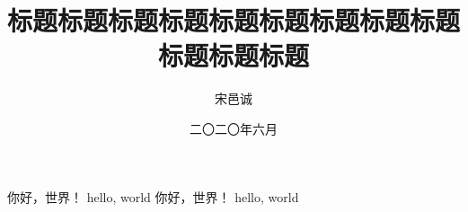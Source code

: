 \documentclass[a4paper, 12pt, fontset=windows]{HBUThesis}
\date{二〇二〇年六月}
\title{标题标题标题标题标题标题标题标题标题标题标题标题}
\author{宋邑诚}
\begin{document}
\makecover
\makeEncover
\orgState

你好，世界！
hello, world
\newpage
你好，世界！
hello, world
\layout
\end{document}
